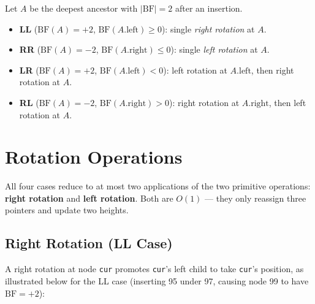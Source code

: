 \documentclass[11pt, a4paper, notitlepage]{report}
\theoremstyle{definition}
\theoremstyle{remark}
\theoremstyle{definition}
\begin{document}
\begin{keyresult}[title={Key Result: Four AVL Rotation Cases}]
Let $A$ be the deepest ancestor with $|\text{BF}| = 2$ after an insertion.
\begin{itemize}
  \item \textbf{LL} ($\text{BF}(A) = +2$, $\text{BF}(A.\text{left}) \geq 0$): single
        \emph{right rotation} at $A$.
  \item \textbf{RR} ($\text{BF}(A) = -2$, $\text{BF}(A.\text{right}) \leq 0$): single
        \emph{left rotation} at $A$.
  \item \textbf{LR} ($\text{BF}(A) = +2$, $\text{BF}(A.\text{left}) < 0$): left rotation
        at $A.\text{left}$, then right rotation at $A$.
  \item \textbf{RL} ($\text{BF}(A) = -2$, $\text{BF}(A.\text{right}) > 0$): right rotation
        at $A.\text{right}$, then left rotation at $A$.
\end{itemize}
\end{keyresult}

\section{Rotation Operations}
\label{sec:avl-rotations}

All four cases reduce to at most two applications of the two primitive operations:
\textbf{right rotation} and \textbf{left rotation}.  Both are $O(1)$ --- they only
reassign three pointers and update two heights.

\subsection{Right Rotation (LL Case)}
\label{subsec:right-rotation}

A right rotation at node \texttt{cur} promotes \texttt{cur}'s left child to take
\texttt{cur}'s position, as illustrated below for the LL case (inserting 95 under 97,
causing node 99 to have $\text{BF} = +2$):
\end{document}
